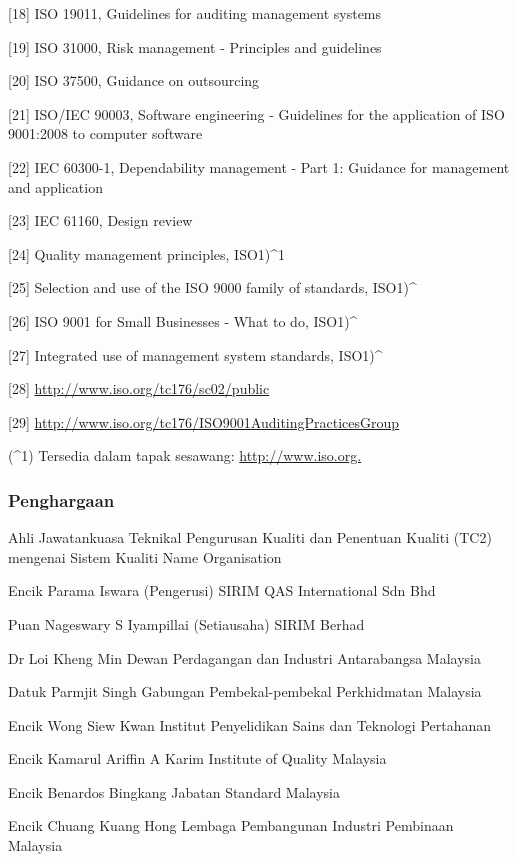 \documentclass[
]{article}
\begin{document}
{[}18{]} ISO 19011, Guidelines for auditing management systems

{[}19{]} ISO 31000, Risk management - Principles and guidelines

{[}20{]} ISO 37500, Guidance on outsourcing

{[}21{]} ISO/IEC 90003, Software engineering - Guidelines for the
application of ISO 9001:2008 to computer software

{[}22{]} IEC 60300-1, Dependability management - Part 1: Guidance for
management and application

{[}23{]} IEC 61160, Design review

{[}24{]} Quality management principles, ISO1)\^{}1

{[}25{]} Selection and use of the ISO 9000 family of standards,
ISO1)\^{}

{[}26{]} ISO 9001 for Small Businesses - What to do, ISO1)\^{}

{[}27{]} Integrated use of management system standards, ISO1)\^{}

{[}28{]} \url{http://www.iso.org/tc176/sc02/public}

{[}29{]} \url{http://www.iso.org/tc176/ISO9001AuditingPracticesGroup}

(\^{}1) Tersedia dalam tapak sesawang: \url{http://www.iso.org.}

\hypertarget{penghargaan}{%
\subsubsection{Penghargaan}\label{penghargaan}}

Ahli Jawatankuasa Teknikal Pengurusan Kualiti dan Penentuan Kualiti
(TC2) mengenai Sistem Kualiti Name Organisation

Encik Parama Iswara (Pengerusi) SIRIM QAS International Sdn Bhd

Puan Nageswary S Iyampillai (Setiausaha) SIRIM Berhad

Dr Loi Kheng Min Dewan Perdagangan dan Industri Antarabangsa Malaysia

Datuk Parmjit Singh Gabungan Pembekal-pembekal Perkhidmatan Malaysia

Encik Wong Siew Kwan Institut Penyelidikan Sains dan Teknologi
Pertahanan

Encik Kamarul Ariffin A Karim Institute of Quality Malaysia

Encik Benardos Bingkang Jabatan Standard Malaysia

Encik Chuang Kuang Hong Lembaga Pembangunan Industri Pembinaan Malaysia
\end{document}
